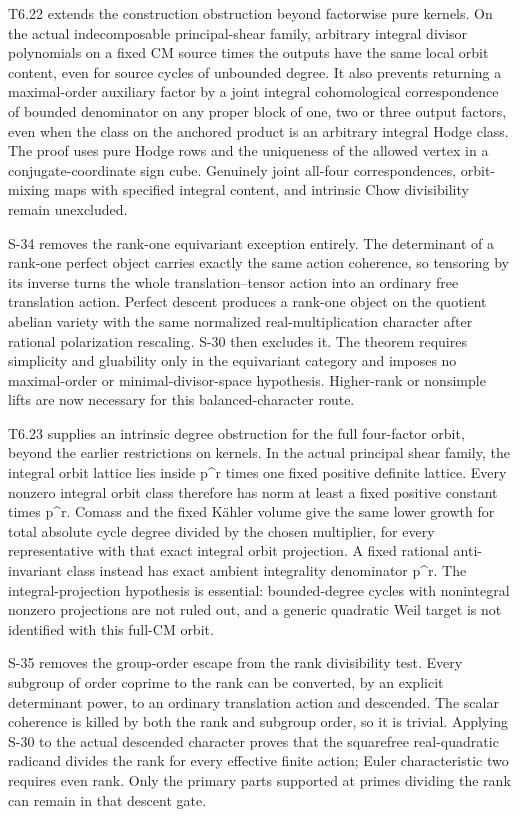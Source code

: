 \documentclass[11pt,a4paper]{article}
\theoremstyle{definition}
\begin{document}
T6.22 extends the construction obstruction beyond factorwise pure
kernels. On the actual indecomposable principal-shear family, arbitrary
integral divisor polynomials on a fixed CM source times the outputs have
the same local orbit content, even for source cycles of unbounded
degree. It also prevents returning a maximal-order auxiliary factor by a
joint integral cohomological correspondence of bounded denominator on
any proper block of one, two or three output factors, even when the
class on the anchored product is an arbitrary integral Hodge class. The
proof uses pure Hodge rows and the uniqueness of the allowed vertex in a
conjugate-coordinate sign cube. Genuinely joint all-four
correspondences, orbit-mixing maps with specified integral content, and
intrinsic Chow divisibility remain unexcluded.

S-34 removes the rank-one equivariant exception entirely. The
determinant of a rank-one perfect object carries exactly the same action
coherence, so tensoring by its inverse turns the whole
translation--tensor action into an ordinary free translation action.
Perfect descent produces a rank-one object on the quotient abelian
variety with the same normalized real-multiplication character after
rational polarization rescaling. S-30 then excludes it. The theorem
requires simplicity and gluability only in the equivariant category and
imposes no maximal-order or minimal-divisor-space hypothesis.
Higher-rank or nonsimple lifts are now necessary for this
balanced-character route.

T6.23 supplies an intrinsic degree obstruction for the full four-factor
orbit, beyond the earlier restrictions on kernels. In the actual
principal shear family, the integral orbit lattice lies inside p\^{}r
times one fixed positive definite lattice. Every nonzero integral orbit
class therefore has norm at least a fixed positive constant times
p\^{}r. Comass and the fixed Kähler volume give the same lower growth
for total absolute cycle degree divided by the chosen multiplier, for
every representative with that exact integral orbit projection. A fixed
rational anti-invariant class instead has exact ambient integrality
denominator p\^{}r. The integral-projection hypothesis is essential:
bounded-degree cycles with nonintegral nonzero projections are not ruled
out, and a generic quadratic Weil target is not identified with this
full-CM orbit.

S-35 removes the group-order escape from the rank divisibility test.
Every subgroup of order coprime to the rank can be converted, by an
explicit determinant power, to an ordinary translation action and
descended. The scalar coherence is killed by both the rank and subgroup
order, so it is trivial. Applying S-30 to the actual descended character
proves that the squarefree real-quadratic radicand divides the rank for
every effective finite action; Euler characteristic two requires even
rank. Only the primary parts supported at primes dividing the rank can
remain in that descent gate.
\end{document}
